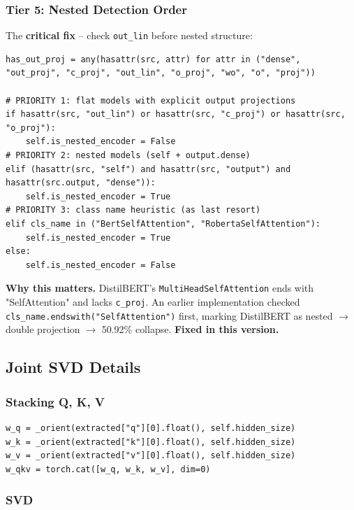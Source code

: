 \subsubsection{Tier 5: Nested Detection Order}

The \textbf{critical fix} -- check \texttt{out\_lin} before nested structure:

\begin{lstlisting}
has_out_proj = any(hasattr(src, attr) for attr in ("dense", "out_proj", "c_proj", "out_lin", "o_proj", "wo", "o", "proj"))

# PRIORITY 1: flat models with explicit output projections
if hasattr(src, "out_lin") or hasattr(src, "c_proj") or hasattr(src, "o_proj"):
    self.is_nested_encoder = False
# PRIORITY 2: nested models (self + output.dense)
elif (hasattr(src, "self") and hasattr(src, "output") and hasattr(src.output, "dense")):
    self.is_nested_encoder = True
# PRIORITY 3: class name heuristic (as last resort)
elif cls_name in ("BertSelfAttention", "RobertaSelfAttention"):
    self.is_nested_encoder = True
else:
    self.is_nested_encoder = False
\end{lstlisting}

\textbf{Why this matters.} DistilBERT's \texttt{MultiHeadSelfAttention} ends with 
"SelfAttention" and lacks \texttt{c\_proj}. An earlier implementation checked 
\texttt{cls\_name.endswith("SelfAttention")} first, marking DistilBERT as nested $\to$ 
double projection $\to$ 50.92\% collapse. \textbf{Fixed in this version.}

\subsection{Joint SVD Details}

\subsubsection{Stacking Q, K, V}

\begin{lstlisting}
w_q = _orient(extracted["q"][0].float(), self.hidden_size)
w_k = _orient(extracted["k"][0].float(), self.hidden_size)
w_v = _orient(extracted["v"][0].float(), self.hidden_size)
w_qkv = torch.cat([w_q, w_k, w_v], dim=0)
\end{lstlisting}

\subsubsection{SVD}

